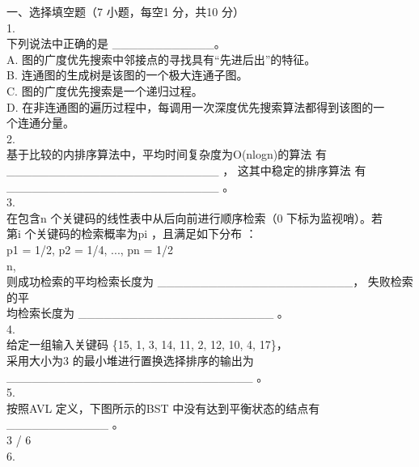
\begin{question}
一、选择填空题（7 小题，每空1 分，共10 分）\\
1.\\
下列说法中正确的是 \_\_\_\_\_\_\_\_\_\_\_\_。\\
A. 图的广度优先搜索中邻接点的寻找具有“先进后出”的特征。\\
B. 连通图的生成树是该图的一个极大连通子图。\\
C. 图的广度优先搜索是一个递归过程。\\
D. 在非连通图的遍历过程中，每调用一次深度优先搜索算法都得到该图的一\\
个连通分量。\\
2.\\
基于比较的内排序算法中，平均时间复杂度为O(nlogn)的算法 有\\
\_\_\_\_\_\_\_\_\_\_\_\_\_\_\_\_\_\_\_\_\_\_\_\_\_ ， 这其中稳定的排序算法 有\\
\_\_\_\_\_\_\_\_\_\_\_\_\_\_\_\_\_\_\_\_\_\_\_\_\_  。\\
3.\\
在包含n 个关键码的线性表中从后向前进行顺序检索（0 下标为监视哨）。若\\
第i 个关键码的检索概率为pi ，且满足如下分布 ：\\
p1 = 1/2, p2 = 1/4,  ..., pn = 1/2\\
n,\\
则成功检索的平均检索长度为  \_\_\_\_\_\_\_\_\_\_\_\_\_\_\_\_\_\_\_\_\_\_\_， 失败检索的平\\
均检索长度为 \_\_\_\_\_\_\_\_\_\_\_\_\_\_\_\_\_\_\_\_\_\_\_ 。\\
4.\\
给定一组输入关键码 \{15,  1,  3,  14,  11,  2,  12,  10,  4,  17\}，\\
采用大小为3 的最小堆进行置换选择排序的输出为\\
\_\_\_\_\_\_\_\_\_\_\_\_\_\_\_\_\_\_\_\_\_\_\_\_\_\_\_\_\_  。\\
5.\\
按照AVL 定义，下图所示的BST 中没有达到平衡状态的结点有\\
\_\_\_\_\_\_\_\_\_\_\_\_ 。\\
3 / 6\\
6.\\

\end{question}
